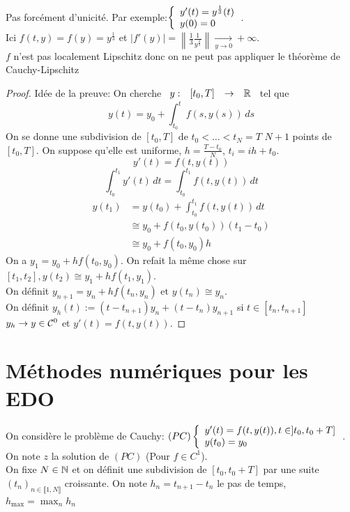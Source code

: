 \documentclass[]{report}
\begin{document}
    \begin{re}{}{}
        Pas forcément d'unicité. Par exemple:$\left\{\begin{array}{ll} y'(t)=y^{\frac{1}{3}}(t)\\y(0)=0 \end{array} \right.$.\\
        Ici $f(t,y)=f(y)=y^{\frac{1}{3}}$ et $|f'(y)|=\left\| \frac{1}{3}\frac{1}{y^{\frac{2}{3}}}\right\|\underset{y\to 0}{\longrightarrow} +\infty$.\\
        $f$ n'est pas localement Lipschitz donc on ne peut pas appliquer le théorème de Cauchy-Lipschitz
    \end{re}

    \begin{proof}
        Idée de la preuve: On cherche $\begin{array}{ccccc} y : & [t_0,T] & \to & \mathbb{R} \end{array}$ tel que
        \[y(t)=y_0+\int_{t_0}^{t} f(s,y(s))\, ds\]
        On se donne une subdivision de $[t_0,T]$ de $t_0<\ldots<t_N=T$ $N+1$ points de $[t_0,T]$. On suppose qu'elle est uniforme, $h=\frac{T-t_0}{N}$, $t_i=ih+t_0$.\\
        \[y'(t)=f(t,y(t))\]
        \[\int_{t_0}^{t_1} y'(t)\, dt= \int_{t_0}^{t_1} f(t,y(t))\, dt\]
        \begin{align*}
            y(t_1)&=y(t_0)+\int_{t_0}^{t_1}f(t,y(t))\, dt\\
            &\cong y_0+f(t_0,y(t_0))(t_1-t_0)\\
            &\cong y_0+f(t_0,y_0)h
        \end{align*}
        On a $y_1=y_0+hf(t_0,y_0)$. On refait la même chose sur $[t_1,t_2], y(t_2)\cong y_1+hf(t_1,y_1)$.\\
        On définit $y_{n+1}=y_n+hf(t_n,y_n)\text{ et }y(t_n)\cong y_n$.\\
        On définit $y_h(t):=(t-t_{n+1})y_n+(t-t_n)y_{n+1}$ si $t\in [t_n,t_{n+1}]$\\
        $y_h\to y\in \mathcal{C}^0$ et $y'(t)=f(t,y(t))$.
    \end{proof}

    \chapter{Méthodes numériques pour les EDO}

    On considère le problème de Cauchy: $(PC)\left\{\begin{array}{ll} y'(t)=f(t,y(t)),t\in ]t_0,t_0+T]\\ y(t_0)=y_0 \end{array} \right.$. On note $z$ la solution de $(PC)$ (Pour $f\in C^1$).\\
    On fixe $N\in \mathbb{N}$ et on définit une subdivision de $[t_0,t_0+T]$ par une suite $(t_n)_{n\in \llbracket 1,N \rrbracket}$ croissante. On note $h_n=t_{n+1}-t_n$ le pas de temps, $h_{\max}=\max_n h_n$
\end{document}

